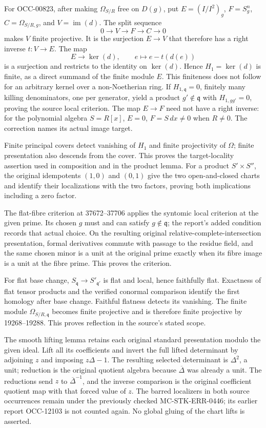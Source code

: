 For OCC-00823, after making \(\Omega_{S/R}\) free on \(D(g)\), put \(E=(I/I^2)_g\), \(F=S_g^n\), \(C=\Omega_{S/R,g}\), and \(V=\operatorname{im}(d)\). The split sequence \[
0\longrightarrow V\longrightarrow F\longrightarrow C\longrightarrow0
\] makes \(V\) finite projective. It is the surjection \(E\to V\) that therefore has a right inverse \(t:V\to E\). The map \[
E\longrightarrow\ker(d),\qquad e\longmapsto e-t(d(e))
\] is a surjection and restricts to the identity on \(\ker(d)\). Hence \(H_1=\ker(d)\) is finite, as a direct summand of the finite module \(E\). This finiteness does not follow for an arbitrary kernel over a non-Noetherian ring. If \(H_{1,\mathfrak q}=0\), finitely many killing denominators, one per generator, yield a product \(g'\notin\mathfrak q\) with \(H_{1,gg'}=0\), proving the source local criterion. The map \(E\to F\) need not have a right inverse: for the polynomial algebra \(S=R[x]\), \(E=0\), \(F=S\,dx\ne0\) when \(R\ne0\). The correction names its actual image target.

Finite principal covers detect vanishing of \(H_1\) and finite projectivity of \(\Omega\); finite presentation also descends from the cover. This proves the target-locality assertion used in composition and in the product lemma. For a product \(S'\times S''\), the original idempotents \((1,0)\) and \((0,1)\) give the two open-and-closed charts and identify their localizations with the two factors, proving both implications including a zero factor.

The flat-fibre criterion at 37672--37706 applies the syntomic local criterion at the given prime. Its chosen \(g\) must and can satisfy \(g\notin\mathfrak q\); the report's added condition records that actual choice. On the resulting original relative-complete-intersection presentation, formal derivatives commute with passage to the residue field, and the same chosen minor is a unit at the original prime exactly when its fibre image is a unit at the fibre prime. This proves the criterion.

For flat base change, \(S_{\mathfrak q}\to S'_{\mathfrak q'}\) is flat and local, hence faithfully flat. Exactness of flat tensor products and the verified conormal comparison identify the first homology after base change. Faithful flatness detects its vanishing. The finite module \(\Omega_{S/R,\mathfrak q}\) becomes finite projective and is therefore finite projective by 19268--19288. This proves reflection in the source's stated scope.

The smooth lifting lemma retains each original standard presentation modulo the given ideal. Lift all its coefficients and invert the full lifted determinant by adjoining \(z\) and imposing \(z\Delta-1\). The resulting selected determinant is \(\Delta^2\), a unit; reduction is the original quotient algebra because \(\overline\Delta\) was already a unit. The reductions send \(z\) to \(\overline\Delta^{-1}\), and the inverse comparison is the original coefficient quotient map with that forced value of \(z\). The barred localizers in both source occurrences remain under the previously checked MC-\AlgebraIdentifierBreak{}STK-\AlgebraIdentifierBreak{}ERR-\AlgebraIdentifierBreak{}0446; its earlier report OCC-12103 is not counted again. No global gluing of the chart lifts is asserted.

